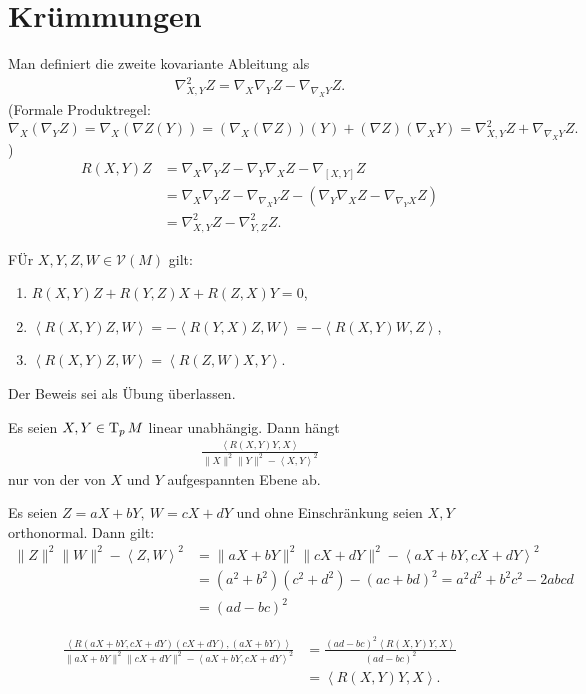 \section{Krümmungen}

Man definiert die zweite kovariante Ableitung als
\begin{align*}
  \nabla_{X,Y}^2Z = \nabla_X\nabla_YZ - \nabla_{\nabla_XY}Z.
\end{align*}
(Formale Produktregel: $\nabla_X(\nabla_YZ) = \nabla_X(\nabla Z(Y)) = (\nabla_X(\nabla Z))(Y) + (\nabla Z)(\nabla_XY) = \nabla_{X,Y}^2Z + \nabla_{\nabla_XY}Z.$)
\begin{align*}
  R(X,Y)Z & = \nabla_X\nabla_YZ - \nabla_Y\nabla_XZ - \nabla_{[X,Y]}Z\\
& = \nabla_X\nabla_YZ - \nabla_{\nabla_XY}Z - (\nabla_Y\nabla_XZ - \nabla_{\nabla_YX}Z)\\
& = \nabla_{X,Y}^2Z - \nabla_{Y,Z}^2Z.
\end{align*}

\begin{Prop}
  FÜr $X,Y,Z,W \in \mathcal V(M)$ gilt:
  \begin{enumerate}[label=(\roman*)]
  \item $R(X,Y)Z + R(Y,Z)X + R(Z,X)Y = 0$,
\item $\left<R(X,Y)Z,W\right> = -\left<R(Y,X)Z,W\right> = - \left<R(X,Y)W,Z\right>$,
\item $\left<R(X,Y)Z,W\right> = \left<R(Z,W)X,Y\right>$.
  \end{enumerate}
\end{Prop}

Der Beweis sei als Übung überlassen.

Es seien $X,Y \in \operatorname{T}_pM$ linear unabhängig. Dann hängt
\begin{align*}
  \frac{\left<R(X,Y)Y,X\right>}{\|X\|^2\|Y\|^2 - \left<X,Y\right>^2}
\end{align*}
nur von der von $X$ und $Y$ aufgespannten Ebene ab.

Es seien $Z = aX + bY, \ W = cX + dY$ und ohne Einschränkung seien $X,Y$ orthonormal.
Dann gilt:
\begin{align*}
  \|Z\|^2\|W\|^2 - \left<Z,W\right>^2 & = \|aX + bY\|^2\|cX + dY\|^2 - \left<aX + bY, cX + dY\right>^2\\
& = (a^2 + b^2)(c^2 + d^2) - (ac + bd)^2 = a^2d^2 + b^2c^2 - 2abcd\\
& = (ad - bc)^2
\end{align*}

\begin{align*}
  \frac{\left<R(aX+bY,cX+dY)(cX+dY),(aX+bY)\right>}{\|aX+bY\|^2\|cX+dY\|^2 - \left<aX+bY, cX+dY\right>^2} & = \frac{(ad-bc)^2\left<R(X,Y)Y,X\right>}{(ad-bc)^2}\\
& = \left<R(X,Y)Y,X\right>.
\end{align*}

